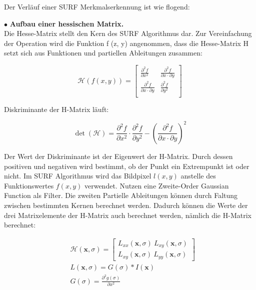 Der Verläuf einer SURF Merkmalserkennung ist wie flogend:

$\bullet$ \textbf{Aufbau einer hessischen Matrix.}\\
Die Hesse-Matrix stellt den Kern des SURF Algorithmus dar. Zur Vereinfachung der Operation wird die Funktion f (z, y) angenommen, dass die Hesse-Matrix H setzt sich aus Funktionen und partiellen Ableitungen zusammen:

\begin{equation}
   \mathcal{H}(f(x,y)) = \begin{bmatrix}
   \frac{\partial^{2}f}{\partial x^{2}} & \frac{\partial^{2}f}{\partial x \cdot \partial y} \\
   \frac{\partial^{2}f}{\partial x \cdot \partial y} & \frac{\partial^{2}f}{\partial y^{2}} \\   
   \end{bmatrix}
\end{equation}

 Diskriminante der H-Matrix läuft:
 
\begin{equation}
   \det(\mathcal{H}) = \frac{\partial^{2}f}{\partial x^{2}} \cdot \frac{\partial^{2}f}{\partial y^{2}} - (\frac{\partial^{2}f}{\partial x \cdot \partial y})^2  
\end{equation}

Der Wert der Diskriminante ist der Eigenwert der H-Matrix. Durch dessen positiven und negativen wird bestimmt, ob der Punkt ein Extrempunkt ist oder nicht. Im SURF Algorithmus wird das Bildpixel $l(x,y)$ anstelle des Funktionswertes $f(x,y)$ verwendet. Nutzen eine Zweite-Order Gaussian Function als Filter. Die zweiten Partielle Ableitungen können durch Faltung zwischen bestimmten Kernen berechnet werden. Dadurch können die Werte der drei Matrixelemente der H-Matrix auch berechnet werden, nämlich die H-Matrix berechnet:

\begin{equation}
\begin{split}
   &\mathcal{H}(\textbf{x},\sigma) = \begin{bmatrix}
   L_{xx}(\textbf{x},\sigma)\ L_{xy}(\textbf{x},\sigma) \\
   L_{xy}(\textbf{x},\sigma)\ L_{yy}(\textbf{x},\sigma)
   \end{bmatrix} \\   
   &L(\textbf{x},\sigma) = G(\sigma)*I(\textbf{x}) \\  
   &G(\sigma) = \frac{\partial^{2}g(\sigma)}{\partial x^{2}}      
\end{split}
\end{equation}


